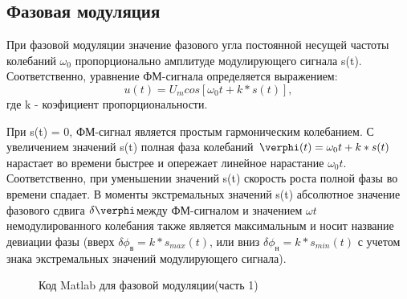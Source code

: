 \documentclass[12pt,a4paper]{scrartcl}
\begin{document}
\clearpage
\newpage
\subsection{Фазовая модуляция}
\label{sec:FM}
При фазовой модуляции значение фазового угла постоянной несущей частоты колебаний $\omega_0$ пропорционально амплитуде модулирующего сигнала s(t). Соответственно, уравнение ФМ-сигнала определяется выражением:
$$u(t) = U_m cos[\omega_0 t+k*s(t)],$$ где k - коэфициент пропорциональности.

При s(t) = 0, ФМ-сигнал является простым гармоническим колебанием. С увеличением значений s(t) полная фаза колебаний $\verphi(t)=\omega_0t + k*s(t)$ нарастает во времени быстрее и опережает линейное нарастание $\omega_0 t$. Соответственно, при уменьшении значений s(t) скорость роста полной фазы во времени спадает. В моменты экстремальных значений s(t) абсолютное значение фазового сдвига $\delta \verphi $между ФМ-сигналом и значением $\omega t$ немодулированного колебания также является максимальным и носит название девиации фазы (вверх $\delta \phi_в = k*s_{max}(t)$, или вниз $\delta \phi_н = k*s_{min}(t)$ с учетом знака экстремальных значений модулирующего сигнала).


\begin{figure}[h!]
\caption{Код Matlab для фазовой модуляции(часть 1)}
\end{figure}
\end{document}
